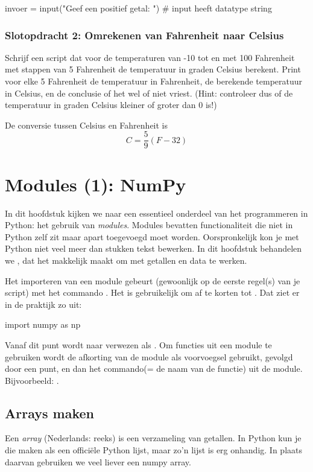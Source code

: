 \documentclass[a4paper,11pt, fleqn]{article}
\newcommand{\ditwc}{Naam van het huidige werkcollege}
\begin{document}
\begin{python}
invoer = input("Geef een positief getal: ")  # input heeft datatype string
\end{python}

\subsubsection{Slotopdracht 2: Omrekenen van Fahrenheit naar Celsius}
Schrijf een script dat voor de temperaturen van -10 tot en met 100 Fahrenheit met stappen van 5 Fahrenheit de temperatuur in graden Celsius berekent. Print voor elke 5 Fahrenheit de temperatuur in Fahrenheit, de berekende temperatuur in Celsius, en de conclusie of het wel of niet vriest. (Hint: controleer dus of de temperatuur in graden Celsius kleiner of groter dan 0 is!)

De conversie tussen Celsius en Fahrenheit is
\begin{equation}
C = \frac{5}{9}(F - 32)
\end{equation}

\clearpage
\renewcommand{\ditwc}{Modules (1): NumPy}
\section[Modules (1): NumPy]{\ditwc}
In dit hoofdstuk kijken we naar een essentieel onderdeel van het programmeren in Python: het gebruik van {\it modules}. Modules bevatten functionaliteit die niet in Python zelf zit maar apart toegevoegd moet worden. Oorspronkelijk kon je met Python niet veel meer dan stukken tekst bewerken. In dit hoofdstuk behandelen we , dat het makkelijk maakt om met getallen en data te werken.

Het importeren van een module gebeurt (gewoonlijk op de eerste regel(s) van je script) met het commando . Het is gebruikelijk om  af te korten tot . Dat ziet er in de praktijk zo uit: 
\begin{python}
import numpy as np
\end{python}
Vanaf dit punt wordt naar  verwezen als . Om functies uit een module te gebruiken wordt de afkorting van de module als voorvoegsel gebruikt, gevolgd door een punt, en dan het commando(= de naam van de functie) uit de module.\\
Bijvoorbeeld: .

\subsection{Arrays maken}
Een {\it array} (Nederlands: reeks) is een verzameling van getallen. In Python kun je die maken als een offici\"ele Python lijst, maar zo'n lijst is erg onhandig. In plaats daarvan gebruiken we veel liever een numpy array.
\end{document}
